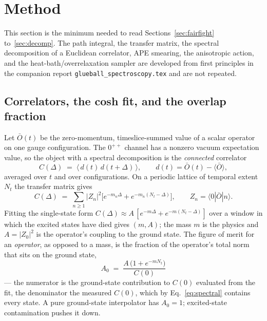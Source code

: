 \documentclass[11pt,a4paper]{article}
\newcommand{\Obar}{\bar{O}}
\newcommand{\Azero}{A_0}
\begin{document}
\section{Method}
\label{sec:method}

This section is the minimum needed to read Sections~\ref{sec:fairfight}
to~\ref{sec:decomp}. The path integral, the transfer matrix, the spectral
decomposition of a Euclidean correlator, APE smearing, the anisotropic action,
and the heat-bath/overrelaxation sampler are developed from first
principles in the companion report \texttt{glueball\_spectroscopy.tex} and are not
repeated.

\subsection{Correlators, the cosh fit, and the overlap fraction}
\label{sec:a0}

Let $\Obar(t)$ be the zero-momentum, timeslice-summed value of a scalar
operator on one gauge configuration. The $0^{++}$ channel has a nonzero vacuum
expectation value, so the object with a spectral decomposition is the
\emph{connected} correlator
\begin{equation}
  C(\Delta) \;=\; \big\langle\, d(t)\, d(t+\Delta) \,\big\rangle,
  \qquad d(t) = \Obar(t) - \langle \Obar \rangle,
  \label{eq:conn}
\end{equation}
averaged over $t$ and over configurations. On a periodic lattice of temporal
extent $N_t$ the transfer matrix gives
\begin{equation}
  C(\Delta) \;=\; \sum_{n\ge1} |Z_n|^2
  \Big[ e^{-m_n \Delta} + e^{-m_n (N_t-\Delta)} \Big],
  \qquad Z_n = \langle 0 | \Obar | n \rangle .
  \label{eq:spectral}
\end{equation}
Fitting the single-state form $C(\Delta) \approx A\,[e^{-m\Delta} +
e^{-m(N_t-\Delta)}]$ over a window in which the excited states have died gives
$(m, A)$; the mass $m$ is the physics and $A = |Z_0|^2$ is the operator's
coupling to the ground state. The figure of merit for an \emph{operator}, as
opposed to a mass, is the fraction of the operator's total norm that sits on the
ground state,
\begin{equation}
  \boxed{\;\Azero \;=\; \frac{A\,\big(1 + e^{-m N_t}\big)}{C(0)}\;}
  \label{eq:a0}
\end{equation}
--- the numerator is the ground-state contribution to $C(0)$ evaluated from the
fit, the denominator the measured $C(0)$, which by Eq.~\eqref{eq:spectral}
contains every state. A pure ground-state interpolator has $\Azero = 1$;
excited-state contamination pushes it down.
\end{document}

